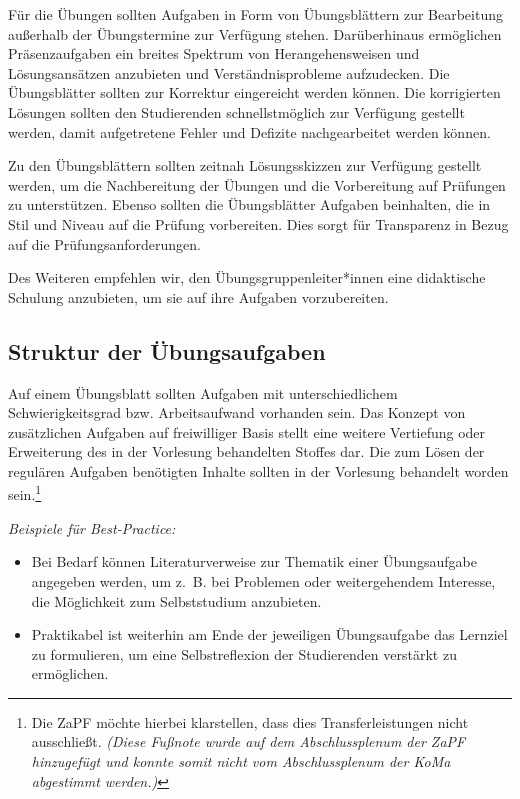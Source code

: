 \documentclass[DIV=calc]{scrartcl}
\begin{document}
Für die Übungen sollten Aufgaben in Form von Übungsblättern zur Bearbeitung
außerhalb der Übungstermine zur Verfügung stehen. Darüberhinaus ermöglichen
Präsenzaufgaben ein breites Spektrum von Herangehensweisen und Lösungsansätzen
anzubieten und Verständnisprobleme aufzudecken.
Die Übungsblätter sollten zur Korrektur eingereicht werden können. Die
korrigierten Lösungen sollten den Studierenden schnellstmöglich zur Verfügung
gestellt werden, damit aufgetretene Fehler und Defizite nachgearbeitet werden
können.

Zu den Übungsblättern sollten zeitnah Lösungsskizzen zur Verfügung gestellt
werden, um die Nachbereitung der Übungen und die Vorbereitung auf Prüfungen
zu unterstützen.
Ebenso sollten die Übungsblätter Aufgaben beinhalten, die in Stil und Niveau
auf die Prüfung vorbereiten. Dies sorgt für Transparenz in Bezug auf die
Prüfungsanforderungen.

Des Weiteren empfehlen wir, den Übungsgruppenleiter*innen eine didaktische
Schulung anzubieten, um sie auf ihre Aufgaben vorzubereiten.

\subsection*{Struktur der Übungsaufgaben}
Auf einem Übungsblatt sollten Aufgaben mit unterschiedlichem Schwierigkeitsgrad
bzw. Arbeitsaufwand vorhanden sein.
Das Konzept von zusätzlichen Aufgaben auf freiwilliger Basis stellt eine
weitere Vertiefung oder Erweiterung des in der Vorlesung behandelten
Stoffes dar. Die zum Lösen der regulären Aufgaben benötigten Inhalte sollten in
der Vorlesung behandelt worden sein.\footnote{Die ZaPF möchte hierbei
	klarstellen, dass dies Transferleistungen nicht ausschließt. \textit{(Diese
	Fußnote wurde auf dem Abschlussplenum der ZaPF hinzugefügt und konnte somit
nicht vom Abschlussplenum der KoMa abgestimmt werden.)}}

\emph{Beispiele für Best-Practice:}
\begin{itemize}
	\item Bei Bedarf können Literaturverweise zur Thematik einer Übungsaufgabe
		angegeben werden, um z.~B. bei Problemen oder weitergehendem Interesse,
		die Möglichkeit zum Selbststudium anzubieten.
	\item Praktikabel ist weiterhin am Ende der jeweiligen Übungsaufgabe das
		Lernziel zu formulieren, um eine Selbstreflexion der Studierenden
		verstärkt zu ermöglichen.
\end{itemize}
\end{document}
